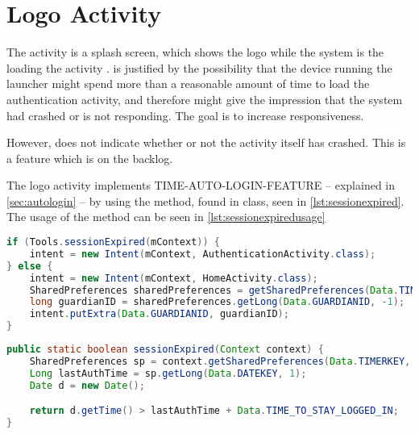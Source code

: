 \section{Logo Activity}
The  activity is a splash screen, which shows the \giraf[] logo while the system is the loading the activity .  is justified by the possibility that the device running the launcher might spend more than a reasonable amount of time to load the authentication activity, and therefore might give the impression that the system had crashed or is not responding. The goal is to increase responsiveness. 


However,  does not indicate whether or not the activity itself has crashed. This is a feature which is on the backlog. 

The logo activity implements TIME-AUTO-LOGIN-FEATURE -- explained in \autoref{sec:autologin} -- by using the  method, found in  class, seen in \autoref{lst:sessionexpired}.
The usage of the  method can be seen in \autoref{lst:sessionexpiredusage}

\begin{lstlisting}[style=sourceCode, language=JAVA, caption=Snippet of: LogoActivity.java, label=lst:sessionexpiredusage] 
if (Tools.sessionExpired(mContext)) {
	intent = new Intent(mContext, AuthenticationActivity.class);
} else {
	intent = new Intent(mContext, HomeActivity.class);
	SharedPreferences sharedPreferences = getSharedPreferences(Data.TIMERKEY, 0);
	long guardianID = sharedPreferences.getLong(Data.GUARDIANID, -1);
	intent.putExtra(Data.GUARDIANID, guardianID);
}
\end{lstlisting}


\begin{lstlisting}[style=sourceCode, language=JAVA, caption=Snippet of: Tools.java, label=lst:sessionexpired]
public static boolean sessionExpired(Context context) {
	SharedPreferences sp = context.getSharedPreferences(Data.TIMERKEY, 0);
	Long lastAuthTime = sp.getLong(Data.DATEKEY, 1);
	Date d = new Date();

	return d.getTime() > lastAuthTime + Data.TIME_TO_STAY_LOGGED_IN;
}
	\end{lstlisting}

